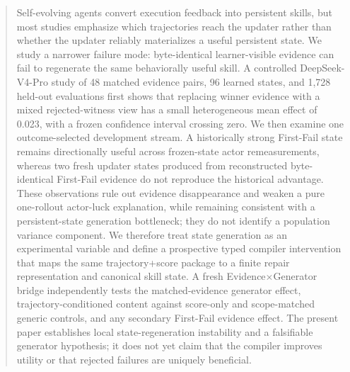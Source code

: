 \begin{abstract}
Self-evolving agents convert execution feedback into persistent skills, but most studies emphasize which trajectories reach the updater rather than whether the updater reliably materializes a useful persistent state. We study a narrower failure mode: byte-identical learner-visible evidence can fail to regenerate the same behaviorally useful skill. A controlled DeepSeek-V4-Pro study of 48 matched evidence pairs, 96 learned states, and 1,728 held-out evaluations first shows that replacing winner evidence with a mixed rejected-witness view has a small heterogeneous mean effect of 0.023, with a frozen confidence interval crossing zero. We then examine one outcome-selected development stream. A historically strong First-Fail state remains directionally useful across frozen-state actor remeasurements, whereas two fresh updater states produced from reconstructed byte-identical First-Fail evidence do not reproduce the historical advantage. These observations rule out evidence disappearance and weaken a pure one-rollout actor-luck explanation, while remaining consistent with a persistent-state generation bottleneck; they do not identify a population variance component. We therefore treat state generation as an experimental variable and define a prospective typed compiler intervention that maps the same trajectory+score package to a finite repair representation and canonical skill state. A fresh Evidence$\times$Generator bridge independently tests the matched-evidence generator effect, trajectory-conditioned content against score-only and scope-matched generic controls, and any secondary First-Fail evidence effect. The present paper establishes local state-regeneration instability and a falsifiable generator hypothesis; it does not yet claim that the compiler improves utility or that rejected failures are uniquely beneficial.
\end{abstract}
